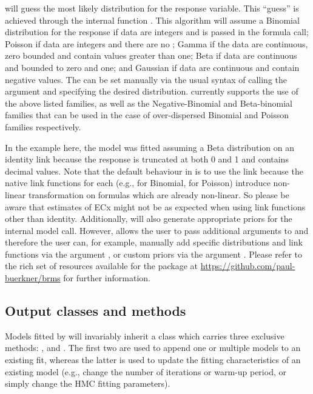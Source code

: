\documentclass[
  shortnames]{jss}
\begin{document}
 will guess the most likely distribution for the response variable. This ``guess'' is achieved through the internal function . This algorithm will assume a Binomial distribution for the response if data are integers and  is passed in the formula call; Poisson if data are integers and there are no ; Gamma if the data are continuous, zero bounded and contain values greater than one; Beta if data are continuous and bounded to zero and one; and Gaussian if data are continuous and contain negative values. The  can be set manually via the usual  syntax of calling the argument  and specifying the desired distribution.  currently supports the use of the above listed families, as well as the Negative-Binomial and Beta-binomial families that can be used in the case of over-dispersed Binomial and Poisson families respectively.

In the example here, the model was fitted assuming a Beta distribution on an identity link because the response is truncated at both 0 and 1 and contains decimal values. Note that the default behaviour in  is to use the  link because the native link functions for each  (e.g.,  for Binomial,  for Poisson) introduce non-linear transformation on formulas which are already non-linear. So please be aware that estimates of ECx might not be as expected when using link functions other than identity. Additionally,  will also generate appropriate priors for the internal  model call. However,  allows the user to pass additional arguments to  and therefore the user can, for example, manually add specific distributions and link functions via the argument , or custom priors via the argument . Please refer to the rich set of resources available for the  package at \url{https://github.com/paul-buerkner/brms} for further information.

\hypertarget{output-classes-and-methods}{%
\subsection{Output classes and methods}\label{output-classes-and-methods}}

Models fitted by  will invariably inherit a class  which carries three exclusive methods: \code{+},  and . The first two are used to append one or multiple models to an existing fit, whereas the latter is used to update the fitting characteristics of an existing model (e.g., change the number of iterations or warm-up period, or simply change the HMC fitting parameters).
\end{document}
